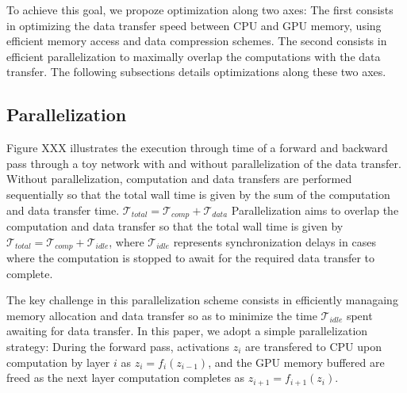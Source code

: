 \documentclass[11pt,onecolumn]{article}
\begin{document}
To achieve this goal, we propoze optimization along two axes:
The first consists in optimizing the data transfer speed between CPU and GPU memory,
using efficient memory access and data compression schemes.
The second consists in efficient parallelization to maximally overlap the computations
with the data transfer.
The following subsections details optimizations along these two axes.

\subsection{Parallelization}

Figure XXX illustrates the execution through time of a forward 
and backward pass through a toy network with and without parallelization of the data transfer.
Without parallelization, computation and data transfers are performed sequentially 
so that the total wall time is given by the sum of the computation and data transfer time.
$\mathcal{T}_{total} = \mathcal{T}_{comp} + \mathcal{T}_{data}$
Parallelization aims to overlap the computation and data transfer so that the total wall time is given by
$\mathcal{T}_{total} = \mathcal{T}_{comp} + \mathcal{T}_{idle}$, where $\mathcal{T}_{idle}$ represents synchronization delays in cases where the computation is stopped to await for the required data transfer to complete.

The key challenge in this parallelization scheme consists in efficiently
managaing memory allocation and data transfer so as to
minimize the time $\mathcal{T}_{idle}$ spent awaiting for data transfer.
In this paper, we adopt a simple parallelization strategy:
During the forward pass, activations $z_i$ are transfered to CPU 
upon computation by layer $i$ as $z_i = f_i(z_{i-1})$,
and the GPU memory buffered are freed as the next layer computation 
completes as $z_{i+1} = f_{i+1}(z_{i})$.
\end{document}
